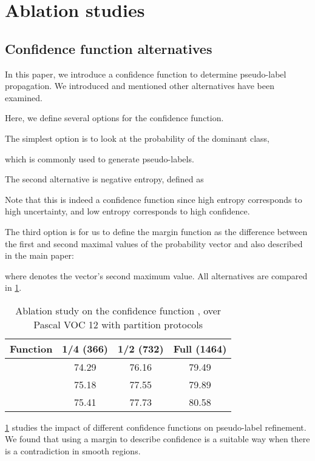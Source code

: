 \documentclass{article}
\renewcommand{\cite}[1]{\citep{#1}}
\begin{document}
\section{Ablation studies}






\subsection{Confidence function alternatives}
\label{sec:Confidence}
In this paper, we introduce a confidence function to determine pseudo-label propagation.
We introduced  and mentioned other alternatives have been examined.

Here, we define several options for the confidence function.

The simplest option is to look at the probability of the dominant class,

which is commonly used to generate pseudo-labels.

The second alternative is negative entropy, defined as

Note that this is indeed a confidence function since high entropy corresponds to high uncertainty, and low entropy corresponds to high confidence.

The third option is for us to define the margin function \cite{Scheffer2001ActiveHM,Shin2021AllYN} as the difference between the first and second maximal values of the probability vector and also described in the main paper:

where  denotes the vector's second maximum value.
All alternatives are compared in \cref{tab:abalation_kappa}.

\begin{table}
\centering
\caption{Ablation study on the confidence function , over Pascal VOC 12 with partition protocols}
\setlength{\tabcolsep}{10pt}
\label{tab:abalation_kappa}
\begin{tabular}{cccc}
\toprule
\textbf{Function}    & \textbf{1/4 (366)} & \textbf{1/2 (732)} & \textbf{Full (1464)}    \\
\midrule
      & 74.29 & 76.16 & 79.49   \\
   &  75.18 & 77.55& 79.89   \\
 &  75.41 & 77.73 & 80.58   \\
\bottomrule
\end{tabular}
\end{table}

\cref{tab:abalation_kappa} studies the impact of different confidence functions on pseudo-label refinement.
We found that using a margin to describe confidence is a suitable way when there is a contradiction in smooth regions.
\end{document}
